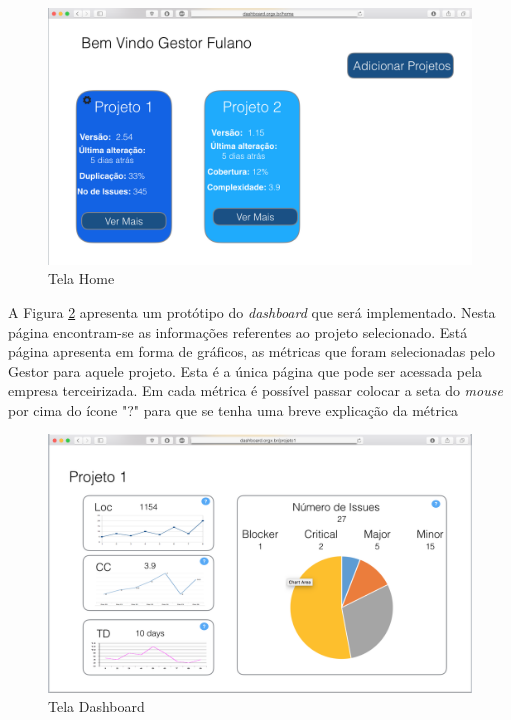 \graphicspath{{figuras/}}
\begin{figure}
\centering
\includegraphics[scale=0.60]{telaHome2.png}
\caption{Tela Home}
\label{img:telaHome}
\end{figure} 

A Figura \ref{img:telaDashboard} apresenta um protótipo do \textit{dashboard} que será implementado. Nesta página encontram-se as informações referentes ao projeto selecionado. Está página apresenta em forma de gráficos, as métricas que foram selecionadas pelo Gestor para aquele projeto. Esta é a única página que pode ser acessada pela empresa terceirizada. Em cada métrica é possível passar colocar a seta do \textit{mouse} por cima do ícone "?" para que se tenha uma breve explicação da métrica 

\graphicspath{{figuras/}}
\begin{figure}
\centering
\includegraphics[scale=0.60]{telaDashboard.png}
\caption{Tela Dashboard}
\label{img:telaDashboard}
\end{figure} 

